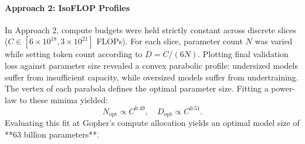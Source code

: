 \documentclass[../../main.tex]{subfiles}
\begin{document}
\paragraph{Approach 2: IsoFLOP Profiles}
In Approach 2, compute budgets were held strictly constant across discrete slices ($C \in [6 \times 10^{18}, 3 \times 10^{21}]$ FLOPs). For each slice, parameter count $N$ was varied while setting token count according to $D = C / (6N)$. Plotting final validation loss against parameter size revealed a convex parabolic profile: undersized models suffer from insufficient capacity, while oversized models suffer from undertraining. The vertex of each parabola defines the optimal parameter size. Fitting a power-law to these minima yielded:
\begin{equation}
N_{\text{opt}} \propto C^{0.49}, \quad D_{\text{opt}} \propto C^{0.51}.
\label{eq:chinchilla_approach2_exponents}
\end{equation}
Evaluating this fit at Gopher's compute allocation yields an optimal model size of **63 billion parameters**.
\end{document}

